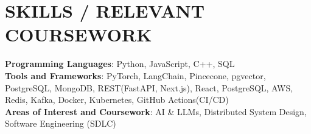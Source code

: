 \documentclass[letterpaper,11pt]{article}
\newcommand{\SectionListBegin}{\begin{itemize}[leftmargin=0.15in, label={}]}
\newcommand{\SectionListEnd}{\end{itemize}}
\newcommand{\swallow}[1]{}
\begin{document}
\section{SKILLS / RELEVANT COURSEWORK}
  \SectionListBegin
    \small{\item{
    \vspace{1mm}
     \textbf{Programming Languages}{: Python, JavaScript, C++, SQL} \\
     \vspace{1mm}
     \textbf{Tools and Frameworks}{: PyTorch, LangChain, Pincecone, pgvector, PostgreSQL, MongoDB, REST(FastAPI, Next.js), React, PostgreSQL, AWS, Redis, Kafka, Docker, Kubernetes, GitHub Actions(CI/CD)}\\
     \vspace{1mm}
     \textbf{Areas of Interest and Coursework}{: AI \& LLMs, Distributed System Design, Software Engineering (SDLC) \swallow{Distributed System Design, Object Oriented Design (OOD), Computer Architecture} } \\
     \vspace{1mm}
    }}
  \SectionListEnd

\end{document}
